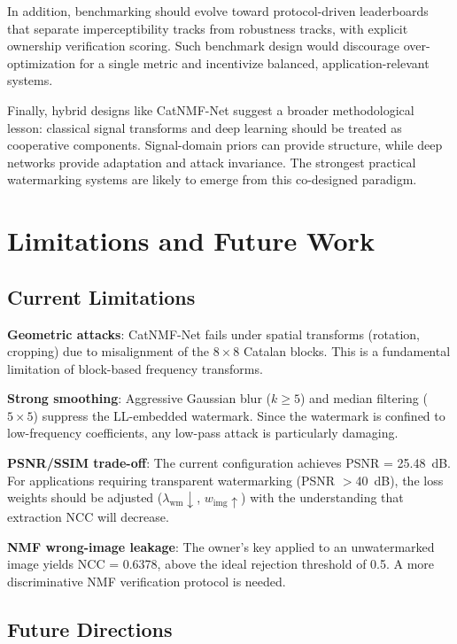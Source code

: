 \documentclass[journal]{IEEEtran}
\begin{document}
In addition, benchmarking should evolve toward protocol-driven leaderboards that
separate imperceptibility tracks from robustness tracks, with explicit ownership
verification scoring. Such benchmark design would discourage over-optimization
for a single metric and incentivize balanced, application-relevant systems.

Finally, hybrid designs like CatNMF-Net suggest a broader methodological lesson:
classical signal transforms and deep learning should be treated as cooperative
components. Signal-domain priors can provide structure, while deep networks
provide adaptation and attack invariance. The strongest practical watermarking
systems are likely to emerge from this co-designed paradigm.

\section{Limitations and Future Work}

\subsection{Current Limitations}

\textbf{Geometric attacks}: CatNMF-Net fails under spatial transforms
(rotation, cropping) due to misalignment of the $8 \times 8$ Catalan
blocks. This is a fundamental limitation of block-based frequency
transforms.

\textbf{Strong smoothing}: Aggressive Gaussian blur ($k \geq 5$) and
median filtering ($5 \times 5$) suppress the LL-embedded watermark.
Since the watermark is confined to low-frequency coefficients, any
low-pass attack is particularly damaging.

\textbf{PSNR/SSIM trade-off}: The current configuration achieves
PSNR = 25.48~dB. For applications requiring transparent watermarking
(PSNR $>$40~dB), the loss weights should be adjusted
($\lambda_{\text{wm}} \downarrow$, $w_{\text{img}} \uparrow$) with
the understanding that extraction NCC will decrease.

\textbf{NMF wrong-image leakage}: The owner's key applied to an
unwatermarked image yields NCC = 0.6378, above the ideal rejection
threshold of 0.5. A more discriminative NMF verification protocol
is needed.

\subsection{Future Directions}
\end{document}
